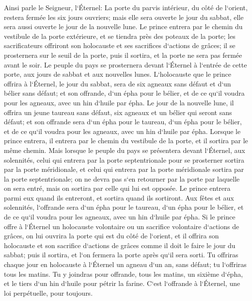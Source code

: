 \verse Ainsi parle le Seigneur, l`Éternel: La porte du parvis intérieur, du côté de l`orient, restera fermée les six jours ouvriers; mais elle sera ouverte le jour du sabbat, elle sera aussi ouverte le jour de la nouvelle lune. 
\verse Le prince entrera par le chemin du vestibule de la porte extérieure, et se tiendra près des poteaux de la porte; les sacrificateurs offriront son holocauste et ses sacrifices d`actions de grâces; il se prosternera sur le seuil de la porte, puis il sortira, et la porte ne sera pas fermée avant le soir. 
\verse Le peuple du pays se prosternera devant l`Éternel à l`entrée de cette porte, aux jours de sabbat et aux nouvelles lunes. 
\verse L`holocauste que le prince offrira à l`Éternel, le jour du sabbat, sera de six agneaux sans défaut et d`un bélier sans défaut; 
\verse et son offrande, d`un épha pour le bélier, et de ce qu`il voudra pour les agneaux, avec un hin d`huile par épha. 
\verse Le jour de la nouvelle lune, il offrira un jeune taureau sans défaut, six agneaux et un bélier qui seront sans défaut; 
\verse et son offrande sera d`un épha pour le taureau, d`un épha pour le bélier, et de ce qu`il voudra pour les agneaux, avec un hin d`huile par épha. 
\verse Lorsque le prince entrera, il entrera par le chemin du vestibule de la porte, et il sortira par le même chemin. 
\verse Mais lorsque le peuple du pays se présentera devant l`Éternel, aux solennités, celui qui entrera par la porte septentrionale pour se prosterner sortira par la porte méridionale, et celui qui entrera par la porte méridionale sortira par la porte septentrionale; on ne devra pas s`en retourner par la porte par laquelle on sera entré, mais on sortira par celle qui lui est opposée. 
\verse Le prince entrera parmi eux quand ils entreront, et sortira quand ils sortiront. 
\verse Aux fêtes et aux solennités, l`offrande sera d`un épha pour le taureau, d`un épha pour le bélier, et de ce qu`il voudra pour les agneaux, avec un hin d`huile par épha. 
\verse Si le prince offre à l`Éternel un holocauste volontaire ou un sacrifice volontaire d`actions de grâces, on lui ouvrira la porte qui est du côté de l`orient, et il offrira son holocauste et son sacrifice d`actions de grâces comme il doit le faire le jour du sabbat; puis il sortira, et l`on fermera la porte après qu`il sera sorti. 
\verse Tu offriras chaque jour en holocauste à l`Éternel un agneau d`un an, sans défaut; tu l`offriras tous les matins. 
\verse Tu y joindras pour offrande, tous les matins, un sixième d`épha, et le tiers d`un hin d`huile pour pétrir la farine. C`est l`offrande à l`Éternel, une loi perpétuelle, pour toujours. 
